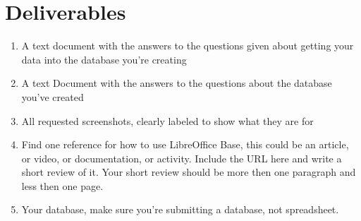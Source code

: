 \documentclass[12pt]{article}
\begin{document}
\section*{Deliverables}
\begin{enumerate}
    \item A text document with the answers to the questions given about getting your data into the database you're creating
    \item A text Document with the answers to the questions about the database you've created
    \item All requested screenshots, clearly labeled to show what they are for
    \item Find one reference for how to use LibreOffice Base, this could be an article, or video, or documentation, or activity.  Include the URL here and write a short review of it. Your short review should be more then one paragraph and less then one page.
    \item Your database, make sure you're submitting a database, not spreadsheet. 
\end{enumerate} 
\end{document}
